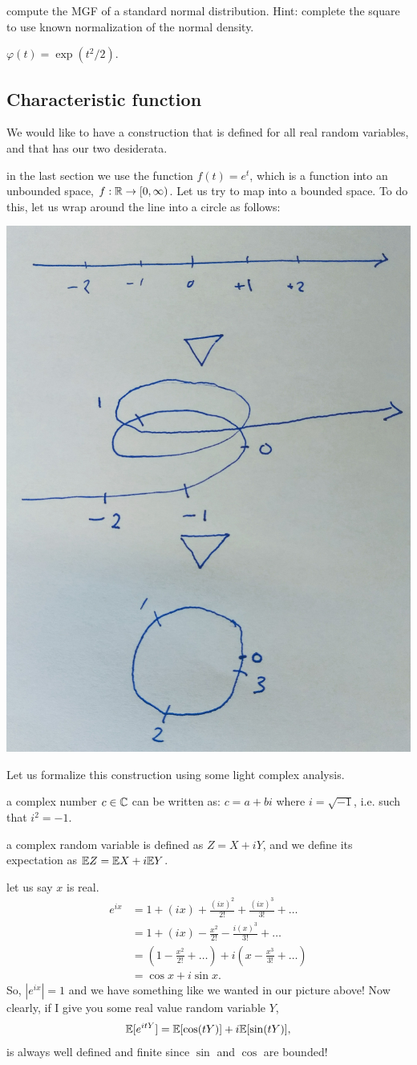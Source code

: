 \documentclass{article}
\begin{document}
 compute the MGF of a standard normal distribution. Hint: complete the square to use known normalization of the normal density.

 $\varphi(t) = \exp(t^2 / 2)$. 


\subsection{Characteristic function}

We would like to have a construction that is defined for all real random variables, and that has our two desiderata. 

 in the last section we use the function $f(t) = e^t$, which is a function into an unbounded space, $f : {\mathbb R} \to [0, \infty)$. Let us try to map into a bounded space. To do this, let us wrap around the line into a circle as follows:
\begin{center}
	\includegraphics[width=0.3\linewidth]{figures/ch-fct} 
\end{center}
Let us formalize this construction using some light complex analysis.

 a complex number $c \in {\mathbb C}$ can be written as: $c = a + b i$ where $i = \sqrt{-1}$, i.e. such that $i^2 = -1$.

 a complex random variable is defined as $Z = X + iY$, and we define its expectation as ${\mathbb E} Z = {\mathbb E} X + i{\mathbb E} Y$.

 let us say $x$ is real.  
\begin{align*}
	e^{ix} &= 1 + (ix) + \frac{(ix)^2}{2!} + \frac{(ix)^3}{3!} + \dots \\
	&= 1 + (ix) - \frac{x^2}{2!} - \frac{i(x)^3}{3!} + \dots \\
	&= (1 - \frac{x^2}{2!} + \dots) + i(x - \frac{x^3}{3!} + \dots) \\
	&= \cos x + i \sin x.
\end{align*}
So, $|e^{ix}| = 1$ and we have something like we wanted in our picture above! Now clearly, if I give you some real value random variable $Y$,
\[ {\mathbb E}[e^{itY}] = {\mathbb E}[\cos(tY)] + i {\mathbb E}[\sin(tY)], \]
is always well defined and finite since $\sin$ and $\cos$ are bounded!
\end{document}
